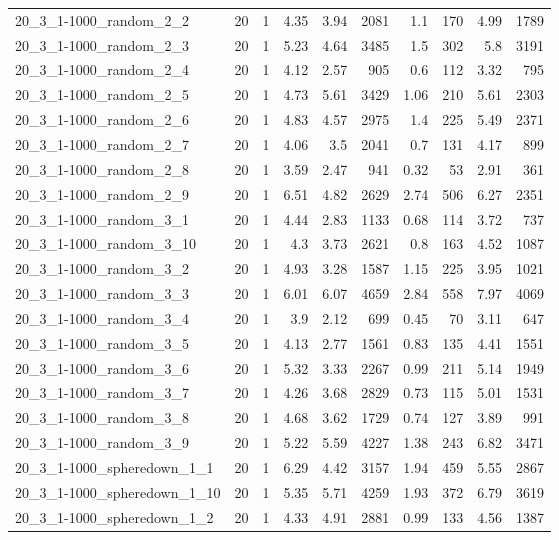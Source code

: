 \begin{center}
\begin{scriptsize}
\begin{longtable}{lrrrrrrrrr}
20\_3\_1-1000\_random\_2\_2 & 20 & 1 & 4.35 & 3.94 & 2081 & 1.1 & 170 & 4.99 & 1789\\
20\_3\_1-1000\_random\_2\_3 & 20 & 1 & 5.23 & 4.64 & 3485 & 1.5 & 302 & 5.8 & 3191\\
20\_3\_1-1000\_random\_2\_4 & 20 & 1 & 4.12 & 2.57 & 905 & 0.6 & 112 & 3.32 & 795\\
20\_3\_1-1000\_random\_2\_5 & 20 & 1 & 4.73 & 5.61 & 3429 & 1.06 & 210 & 5.61 & 2303\\
20\_3\_1-1000\_random\_2\_6 & 20 & 1 & 4.83 & 4.57 & 2975 & 1.4 & 225 & 5.49 & 2371\\
20\_3\_1-1000\_random\_2\_7 & 20 & 1 & 4.06 & 3.5 & 2041 & 0.7 & 131 & 4.17 & 899\\
20\_3\_1-1000\_random\_2\_8 & 20 & 1 & 3.59 & 2.47 & 941 & 0.32 & 53 & 2.91 & 361\\
20\_3\_1-1000\_random\_2\_9 & 20 & 1 & 6.51 & 4.82 & 2629 & 2.74 & 506 & 6.27 & 2351\\
20\_3\_1-1000\_random\_3\_1 & 20 & 1 & 4.44 & 2.83 & 1133 & 0.68 & 114 & 3.72 & 737\\
20\_3\_1-1000\_random\_3\_10 & 20 & 1 & 4.3 & 3.73 & 2621 & 0.8 & 163 & 4.52 & 1087\\
20\_3\_1-1000\_random\_3\_2 & 20 & 1 & 4.93 & 3.28 & 1587 & 1.15 & 225 & 3.95 & 1021\\
20\_3\_1-1000\_random\_3\_3 & 20 & 1 & 6.01 & 6.07 & 4659 & 2.84 & 558 & 7.97 & 4069\\
20\_3\_1-1000\_random\_3\_4 & 20 & 1 & 3.9 & 2.12 & 699 & 0.45 & 70 & 3.11 & 647\\
20\_3\_1-1000\_random\_3\_5 & 20 & 1 & 4.13 & 2.77 & 1561 & 0.83 & 135 & 4.41 & 1551\\
20\_3\_1-1000\_random\_3\_6 & 20 & 1 & 5.32 & 3.33 & 2267 & 0.99 & 211 & 5.14 & 1949\\
20\_3\_1-1000\_random\_3\_7 & 20 & 1 & 4.26 & 3.68 & 2829 & 0.73 & 115 & 5.01 & 1531\\
20\_3\_1-1000\_random\_3\_8 & 20 & 1 & 4.68 & 3.62 & 1729 & 0.74 & 127 & 3.89 & 991\\
20\_3\_1-1000\_random\_3\_9 & 20 & 1 & 5.22 & 5.59 & 4227 & 1.38 & 243 & 6.82 & 3471\\
20\_3\_1-1000\_spheredown\_1\_1 & 20 & 1 & 6.29 & 4.42 & 3157 & 1.94 & 459 & 5.55 & 2867\\
20\_3\_1-1000\_spheredown\_1\_10 & 20 & 1 & 5.35 & 5.71 & 4259 & 1.93 & 372 & 6.79 & 3619\\
20\_3\_1-1000\_spheredown\_1\_2 & 20 & 1 & 4.33 & 4.91 & 2881 & 0.99 & 133 & 4.56 & 1387\\

\end{longtable}
\end{scriptsize}
\end{center}
